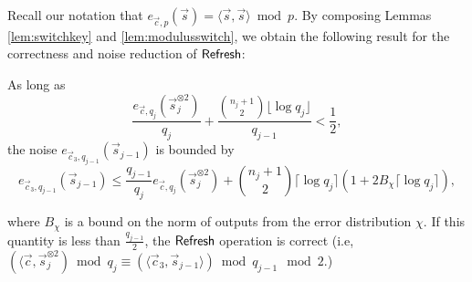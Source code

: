     Recall our notation that $e_{\vec{c}, p}(\vec{s}) = \langle \vec{s}, \vec{s} \rangle \bmod p$. By composing Lemmas \ref{lem:switchkey} and \ref{lem:modulusswitch}, we obtain the following result for the correctness and noise reduction of ${\sf Refresh}$:
    \begin{lemma} \label{lem:refreshlem}
        As long as
        \[\frac{e_{\vec{c}, q_j}(\vec{s}_j^{\otimes 2})}{q_j} + \frac{{{n_j + 1}\choose{2}} \lfloor \log q_j \rfloor}{q_{j-1}} < \frac{1}{2},\]
        the noise $e_{\vec{c}_3, q_{j-1}}(\vec{s}_{j-1})$ is bounded by
        \[e_{\vec{c}_3, q_{j-1}}(\vec{s}_{j-1}) \leq \frac{q_{j-1}}{q_j}e_{\vec{c}, q_j}(\vec{s}_j^{\otimes 2}) + {{n_j + 1}\choose{2}} \lceil \log q_j \rceil \left( 1 + 2 B_\chi \lceil \log q_j \rceil \right),\]

        where $B_\chi$ is a bound on the norm of outputs from the error distribution $\chi$. If this quantity is less than $\frac{q_{j-1}}{2}$, the ${\sf Refresh}$ operation is correct (i.e, $(\langle \vec{c}, \vec{s}_j^{\otimes 2}) \bmod q_j \equiv (\langle \vec{c}_3, \vec{s}_{j-1} \rangle) \bmod q_{j-1} \mod 2$.)
    \end{lemma}
